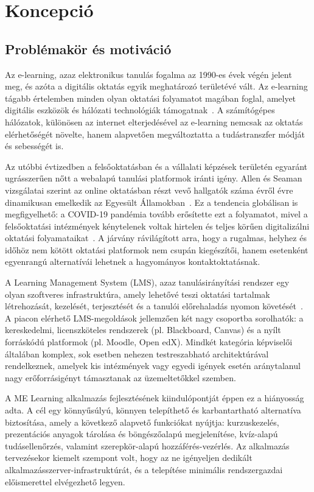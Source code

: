 \chapter{Koncepció}

\section{Problémakör és motiváció}

Az e-learning, azaz elektronikus tanulás fogalma az 1990-es évek végén jelent meg, és azóta a digitális oktatás egyik meghatározó területévé vált. Az e-learning tágabb értelemben minden olyan oktatási folyamatot magában foglal, amelyet digitális eszközök és hálózati technológiák támogatnak~\cite{rosenberg2001elearning}. A számítógépes hálózatok, különösen az internet elterjedésével az e-learning nemcsak az oktatás elérhetőségét növelte, hanem alapvetően megváltoztatta a tudástranszfer módját és sebességét is.

Az utóbbi évtizedben a felsőoktatásban és a vállalati képzések területén egyaránt ugrásszerűen nőtt a webalapú tanulási platformok iránti igény. Allen és Seaman vizsgálatai szerint az online oktatásban részt vevő hallgatók száma évről évre dinamikusan emelkedik az Egyesült Államokban~\cite{allen2013changing}. Ez a tendencia globálisan is megfigyelhető: a COVID-19 pandémia tovább erősítette ezt a folyamatot, mivel a felsőoktatási intézmények kénytelenek voltak hirtelen és teljes körűen digitalizálni oktatási folyamataikat~\cite{hodges2020difference}. A járvány rávilágított arra, hogy a rugalmas, helyhez és időhöz nem kötött oktatási platformok nem csupán kiegészítői, hanem esetenként egyenrangú alternatívái lehetnek a hagyományos kontaktoktatásnak.

A Learning Management System (LMS), azaz tanulásirányítási rendszer egy olyan szoftveres infrastruktúra, amely lehetővé teszi oktatási tartalmak létrehozását, kezelését, terjesztését és a tanulói előrehaladás nyomon követését~\cite{watson2007lms}. A piacon elérhető LMS-megoldások jellemzően két nagy csoportba sorolhatók: a kereskedelmi, licenszköteles rendszerek (pl. Blackboard, Canvas) és a nyílt forráskódú platformok (pl. Moodle, Open edX). Mindkét kategória képviselői általában komplex, sok esetben nehezen testreszabható architektúrával rendelkeznek, amelyek kis intézmények vagy egyedi igények esetén aránytalanul nagy erőforrásigényt támasztanak az üzemeltetőkkel szemben.

A ME Learning alkalmazás fejlesztésének kiindulópontját éppen ez a hiányosság adta. A cél egy könnyűsúlyú, könnyen telepíthető és karbantartható alternatíva biztosítása, amely a következő alapvető funkciókat nyújtja: kurzuskezelés, prezentációs anyagok tárolása és böngészőalapú megjelenítése, kvíz-alapú tudásellenőrzés, valamint szerepkör-alapú hozzáférés-vezérlés. Az alkalmazás tervezésekor kiemelt szempont volt, hogy az ne igényeljen dedikált alkalmazásszerver-infrastruktúrát, és a telepítése minimális rendszergazdai előismerettel elvégezhető legyen.

